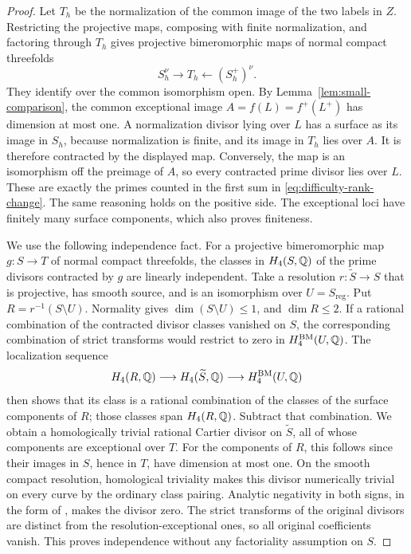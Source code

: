\begin{proof}
Let \(T_h\) be the normalization of the common image of the two labels in
\(Z\).  Restricting the projective maps, composing with finite
normalization, and factoring through \(T_h\) gives projective
bimeromorphic maps of normal compact threefolds
\[
 S_h^\nu\longrightarrow T_h\longleftarrow (S_h^+)^\nu.
\]
They identify over the common isomorphism open.  By
Lemma~\ref{lem:small-comparison}, the common exceptional image
\(A=f(L)=f^+(L^+)\) has dimension at most one.  A normalization divisor
lying over \(L\) has a surface as its image in \(S_h\), because
normalization is finite, and its image in \(T_h\) lies over \(A\).
It is therefore contracted by the displayed map.  Conversely, the map is
an isomorphism off the preimage of \(A\), so every contracted prime divisor
lies over \(L\).  These are exactly the primes counted in the first sum
in \eqref{eq:difficulty-rank-change}.  The same reasoning holds on the
positive side.  The exceptional loci have finitely many surface components,
which also proves finiteness.

We use the following independence fact.  For a projective bimeromorphic
map \(g:S\to T\) of normal compact threefolds, the classes in
\(H_4(S,\mathbb{Q})\) of the prime divisors contracted by \(g\) are linearly
independent.  Take a resolution \(r:\widetilde S\to S\) that is projective,
has smooth source, and is an isomorphism over \(U=S_{\mathrm{reg}}\).  Put
\(R=r^{-1}(S\setminus U)\).  Normality gives \(\dim(S\setminus U)\leq1\),
and \(\dim R\leq2\).  If a rational combination of the contracted divisor
classes vanished on \(S\), the corresponding combination of strict
transforms would restrict to zero in \(H_4^{\mathrm{BM}}(U,\mathbb{Q})\).  The localization
sequence
\[
 H_4(R,\mathbb{Q})\longrightarrow H_4(\widetilde S,\mathbb{Q})
                  \longrightarrow H_4^{\mathrm{BM}}(U,\mathbb{Q})
\]
then shows that its class is a rational combination of the classes of the
surface components of \(R\); those classes span \(H_4(R,\mathbb{Q})\).  Subtract
that combination.  We obtain a homologically trivial rational Cartier
divisor on \(\widetilde S\), all of whose components are exceptional over
\(T\).  For the components of \(R\), this follows since their images in
\(S\), hence in \(T\), have dimension at most one.  On the smooth compact
resolution, homological triviality makes this divisor numerically trivial
on every curve by the ordinary class pairing.  Analytic negativity in both
signs, in the form of \cite[Lemma~2.2]{CanonicalKahler}, makes the
divisor zero.  The strict transforms of the original divisors are distinct
from the resolution-exceptional ones, so all original coefficients vanish.
This proves independence without any factoriality assumption on \(S\).


\end{proof}
